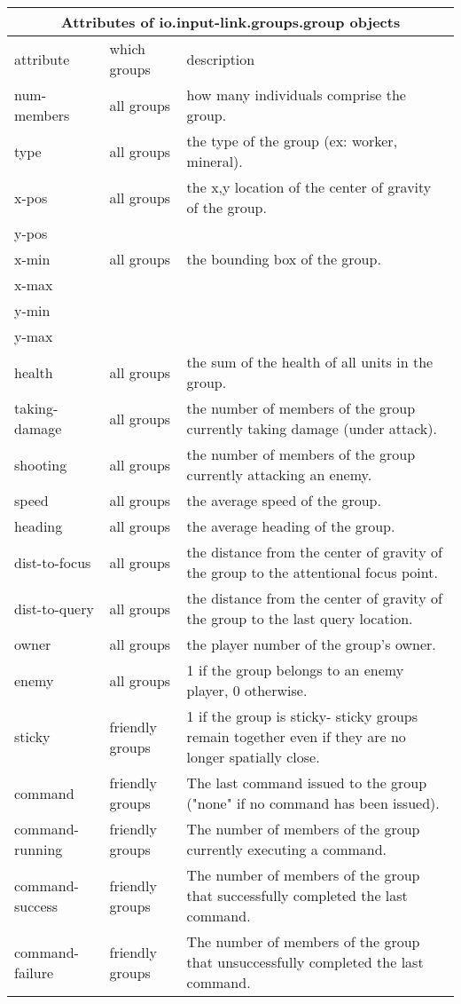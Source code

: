 \documentclass{report}
\begin{document}
\begin{center}
\begin{tabular}{|l|l|p{3.5in}|}
\hline
\multicolumn{3}{|c|}{\textbf{Attributes of io.input-link.groups.group objects}}\\ 
\hline
attribute  & which groups &  description\\
\hline \hline
num-members & all groups &how many individuals comprise the group. \\
\hline
type & all groups &the type of the group (ex: worker, mineral). \\
\hline
x-pos & all groups &the x,y location of the center of gravity of the group.\\
y-pos & \\
\hline
x-min & all groups &the bounding box of the group.\\
x-max & \\
y-min & \\
y-max & \\
\hline
health & all groups &the sum of the health of all units in the group.\\
\hline
taking-damage & all groups &the number of members of the group currently taking damage (under attack). \\
\hline
shooting & all groups &the number of members of the group currently attacking an enemy. \\
\hline
speed & all groups &the average speed of the group. \\
\hline
heading & all groups &the average heading of the group. \\
\hline
dist-to-focus & all groups &the distance from the center of gravity of the group to the attentional focus point.\\
\hline
dist-to-query & all groups &the distance from the center of gravity of the group to the last query location.\\
\hline
owner & all groups &the player number of the group's owner.\\
\hline
enemy & all groups &1 if the group belongs to an enemy player, 0 otherwise.\\
\hline
sticky & friendly groups & 1 if the group is sticky- sticky groups remain together even if they are no longer spatially close.\\
\hline
command & friendly groups & The last command issued to the group ("none" if no command has been issued).\\
\hline
command-running & friendly groups & The number of members of the group currently executing a command.\\
\hline
command-success & friendly groups & The number of members of the group that successfully completed the last command.\\
\hline
command-failure & friendly groups & The number of members of the group that unsuccessfully completed the last command.\\
\hline
\end{tabular}
\end{center}



\end{document}
